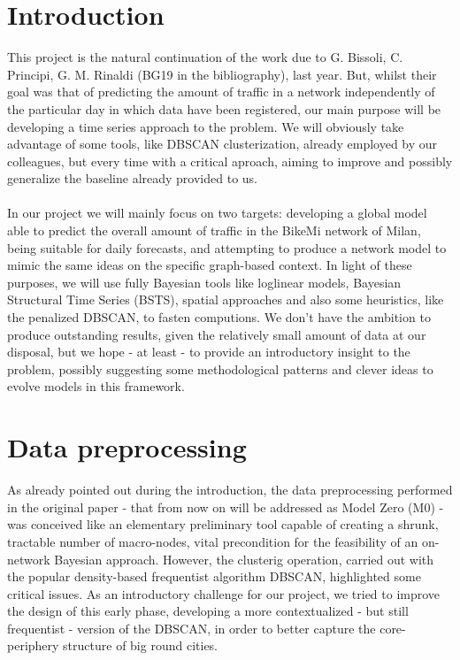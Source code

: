 \documentclass[11pt,twoside]{report}
\begin{document}
\pagestyle{fancy}
\fancyhf{}
\fancyhead{}
\fancyfoot{}
\fancyfoot[C,C]{\thepage}
\renewcommand{\headrulewidth}{0.4pt}

\tableofcontents{}

\chapter*{Introduction}
This project is the natural continuation of the work due to G. Bissoli, C. Principi, G. M. Rinaldi (BG19 in the bibliography), last year. But, whilst their goal was that of predicting the amount of traffic in a network independently of the particular day in which data have been registered, our main purpose will be developing a time series approach to the problem. We will obviously take advantage of some tools, like DBSCAN clusterization, already employed by our colleagues, but every time with a critical aproach, aiming to improve and possibly generalize the baseline already provided to us.\\
\\
In our project we will mainly focus on two targets: developing a global model able to predict the overall amount of traffic in the BikeMi network of Milan, being suitable for daily forecasts, and attempting to produce a network model to mimic the same ideas on the specific graph-based context. In light of these purposes, we will use fully Bayesian tools like loglinear models, Bayesian Structural Time Series (BSTS), spatial approaches and also some heuristics, like the penalized DBSCAN, to fasten computions. We don't have the ambition to produce outstanding results, given the relatively small amount of data at our disposal, but we hope - at least - to provide an introductory insight to the problem, possibly suggesting some methodological patterns and clever ideas to evolve models in this framework.

\chapter{Data preprocessing}
As already pointed out during the introduction, the data preprocessing performed in the original paper - that from now on will be addressed as Model Zero (M0) - was conceived like an elementary preliminary tool capable of creating a shrunk, tractable number of macro-nodes, vital precondition for the feasibility of an on-network Bayesian approach. However, the clusterig operation, carried out with the popular density-based frequentist algorithm DBSCAN, highlighted some critical issues. As an introductory challenge for our project, we tried to improve the design of this early phase, developing a more contextualized - but still frequentist - version of the DBSCAN, in order to better capture the core-periphery structure of big round cities.
\end{document}
